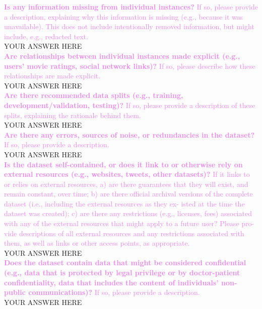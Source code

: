 \documentclass[letterpaper, 10 pt, conference]{ieeeconf}  %
\newcommand{\sectioncolor}{violet}
\begin{document}
    \textcolor{\sectioncolor}{\textbf{
    Is any information missing from individual instances?
    }
    If so, please provide a description, explaining why this information is missing (e.g., because it was unavailable). This does not include intentionally removed information, but might include, e.g., redacted text.
    } \\
    YOUR ANSWER HERE \\
    
    \textcolor{\sectioncolor}{\textbf{
    Are relationships between individual instances made explicit (e.g., users’ movie ratings, social network links)?
    }
    If so, please describe how these relationships are made explicit.
    } \\
    YOUR ANSWER HERE \\
    
    \textcolor{\sectioncolor}{\textbf{
    Are there recommended data splits (e.g., training, development/validation, testing)?
    }
    If so, please provide a description of these splits, explaining the rationale behind them.
    } \\
    YOUR ANSWER HERE \\
    
    \textcolor{\sectioncolor}{\textbf{
    Are there any errors, sources of noise, or redundancies in the dataset?
    }
    If so, please provide a description.
    } \\
    YOUR ANSWER HERE \\
    
    \textcolor{\sectioncolor}{\textbf{
    Is the dataset self-contained, or does it link to or otherwise rely on external resources (e.g., websites, tweets, other datasets)?
    }
    If it links to or relies on external resources, a) are there guarantees that they will exist, and remain constant, over time; b) are there official archival versions of the complete dataset (i.e., including the external resources as they ex- isted at the time the dataset was created); c) are there any restrictions (e.g., licenses, fees) associated with any of the external resources that might apply to a future user? Please pro- vide descriptions of all external resources and any restrictions associated with them, as well as links or other access points, as appropriate.
    } \\
    YOUR ANSWER HERE \\
    
    \textcolor{\sectioncolor}{\textbf{
    Does the dataset contain data that might be considered confidential (e.g., data that is protected by legal privilege or by doctor-patient confidentiality, data that includes the content of individuals’ non-public communications)?
    }
    If so, please provide a description.
    } \\
    YOUR ANSWER HERE \\
    
\end{document}
